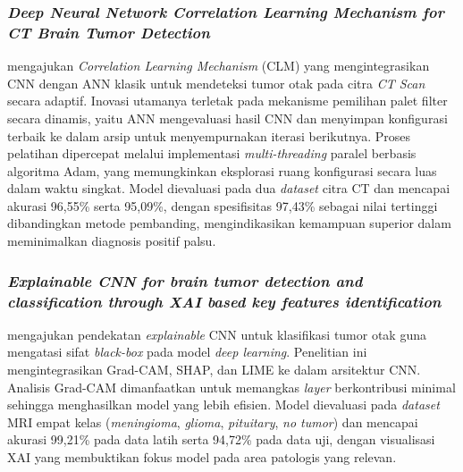 \subsubsection{\textit{Deep Neural Network Correlation Learning Mechanism for CT Brain Tumor Detection}}
\label{subsubsec:CLM}
\textcite{wozniak2021deep} mengajukan \textit{Correlation Learning Mechanism} (CLM) yang mengintegrasikan CNN dengan ANN klasik untuk mendeteksi tumor otak pada citra \textit{CT Scan} secara adaptif. Inovasi utamanya terletak pada mekanisme pemilihan palet filter secara dinamis, yaitu ANN mengevaluasi hasil CNN dan menyimpan konfigurasi terbaik ke dalam arsip untuk menyempurnakan iterasi berikutnya. Proses pelatihan dipercepat melalui implementasi \textit{multi-threading} paralel berbasis algoritma Adam, yang memungkinkan eksplorasi ruang konfigurasi secara luas dalam waktu singkat. Model dievaluasi pada dua \textit{dataset} citra CT dan mencapai akurasi 96,55\% serta 95,09\%, dengan spesifisitas 97,43\% sebagai nilai tertinggi dibandingkan metode pembanding, mengindikasikan kemampuan superior dalam meminimalkan diagnosis positif palsu.

\subsubsection{\textit{Explainable CNN for brain tumor detection and classification through XAI based key features identification}}
\label{subsubsec:expcnn}
\textcite{Iftikhar2025ExplainableCNN} mengajukan pendekatan \textit{explainable} CNN untuk klasifikasi tumor otak guna mengatasi sifat \textit{black-box} pada model \textit{deep learning}. Penelitian ini mengintegrasikan Grad-CAM, SHAP, dan LIME ke dalam arsitektur CNN. Analisis Grad-CAM dimanfaatkan untuk memangkas \textit{layer} berkontribusi minimal sehingga menghasilkan model yang lebih efisien. Model dievaluasi pada \textit{dataset} MRI empat kelas (\textit{meningioma}, \textit{glioma}, \textit{pituitary}, \textit{no tumor}) dan mencapai akurasi 99,21\% pada data latih serta 94,72\% pada data uji, dengan visualisasi XAI yang membuktikan fokus model pada area patologis yang relevan.

